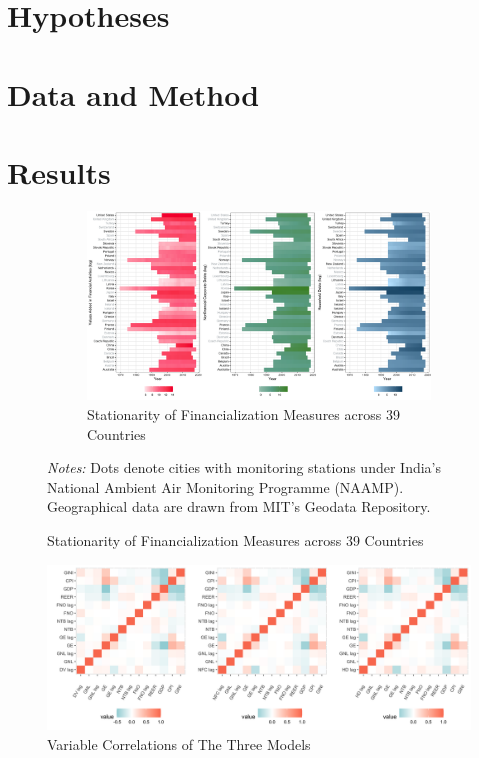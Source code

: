 \documentclass[
]{article}
\begin{document}
\hypertarget{hypotheses}{%
\section{Hypotheses}\label{hypotheses}}

\hypertarget{data-and-method}{%
\section{Data and Method}\label{data-and-method}}

\hypertarget{results}{%
\section{Results}\label{results}}

\begin{figure}[t]

\begin{figure}
\includegraphics[width=64.44in,height=0.4\textheight]{table_and_figure/figure1} \caption{Stationarity of Financialization Measures across 39 Countries}\label{fig:unnamed-chunk-1}
\end{figure}

\textit{Notes:} Dots denote cities with monitoring stations
under India's National Ambient Air Monitoring Programme
(NAAMP).  Geographical data are drawn from MIT's Geodata
Repository.
\end{figure}

\begin{figure}
\includegraphics[width=51.11in,height=0.3\textheight]{table_and_figure/corf} \caption{Variable Correlations of The Three Models}\label{fig:ip}
\end{figure}
\end{document}
